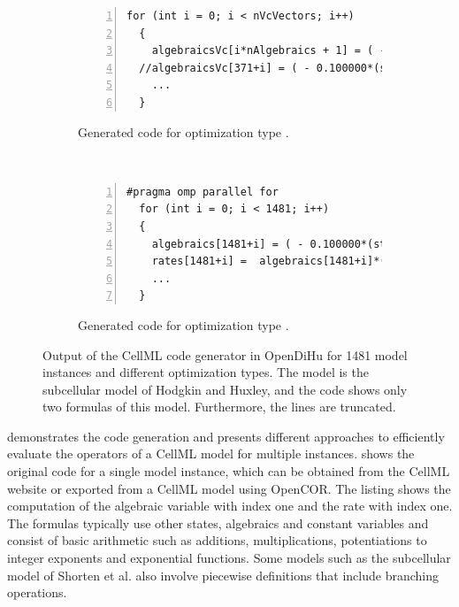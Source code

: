 \begin{figure}
\begin{subfigure}[t]{\textwidth}
\begin{framed}
\begin{lstlisting}[basicstyle=\footnotesize\ttfamily,commentstyle=\color{gray},numbers=left]
  for (int i = 0; i < nVcVectors; i++)
  {
    algebraicsVc[i*nAlgebraics + 1] = ( - 0.100000*(statesVc[i*nStates + 0]+50.000 $\label{alg:b_aovs}$
  //algebraicsVc[371+i] = ( - 0.100000*(statesVc[0+i]+50.0000))/(exponential(- (st $\label{alg:b_sova}$
    ...
  }
\end{lstlisting}
\end{framed}
    \caption{Generated code for optimization type .}%
    \label{fig:cellml_codes_vc}%
  \end{subfigure}\\[4mm]
  \begin{subfigure}[t]{\textwidth}%
  \centering%
\begin{framed}
\begin{lstlisting}[basicstyle=\footnotesize\ttfamily,commentstyle=\color{gray},numbers=left]
  #pragma omp parallel for
  for (int i = 0; i < 1481; i++)
  {
    algebraics[1481+i] = ( - 0.100000*(states[0+i]+50.0000))/(exp(- (states[0+i]+5
    rates[1481+i] =  algebraics[1481+i]*(1.00000 - states[1481+i]) -  algebraics[7
    ...
  }
\end{lstlisting}
\end{framed}
    \caption{Generated code for optimization type .}%
    \label{fig:cellml_codes_openmp}%
  \end{subfigure}
\caption{Output of the CellML code generator in OpenDiHu for 1481 model instances and different optimization types.  The model is the subcellular model of Hodgkin and Huxley, and the code shows only two formulas of this model. Furthermore, the lines are truncated.}%
\label{fig:cellml_codes}%
\end{figure}

 demonstrates the code generation and presents different approaches to efficiently evaluate the operators of a CellML model for multiple instances.  shows the original code for a single model instance, which can be obtained from the CellML website or exported from a CellML model using OpenCOR. The listing shows the computation of the algebraic variable with index one and the rate with index one. The formulas typically use other states, algebraics and constant variables and consist of basic arithmetic such as additions, multiplications, potentiations to integer exponents and exponential functions. Some models such as the subcellular model of Shorten et al. \cite{shorten2007mathematical} also involve piecewise definitions that include  branching operations.

